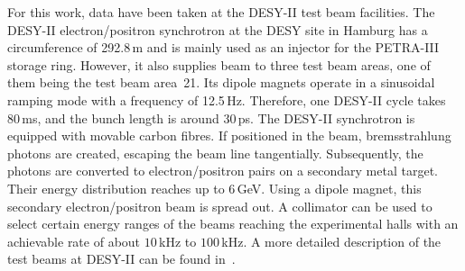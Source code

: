 
For this work, data have been taken at the {DESY-II} test beam facilities. 
The DESY-II electron/positron synchrotron at the DESY site in Hamburg has a circumference of 292.8\,m and is mainly used as an injector for the PETRA-III storage ring. 
However, it also supplies beam to three test beam areas, one  of them being the test beam area~21.
Its dipole magnets operate in a sinusoidal ramping mode with a frequency of 12.5\,Hz. 
Therefore, one DESY-II cycle takes 80\,ms, and the bunch length is around 30\,ps. 
The DESY-II synchrotron is equipped with movable carbon fibres. 
If positioned in the beam, bremsstrahlung photons are created, escaping the beam line tangentially.
Subsequently, the photons are converted to electron/positron pairs on a secondary metal target. 
Their energy distribution reaches up to 6\,GeV. 
Using a dipole magnet, this secondary electron/positron beam is spread out.
A collimator can be used to select certain energy ranges of the beams reaching the experimental halls with an achievable rate of about $10$\,kHz to $100$\,kHz. 
A more detailed description of the test beams at {DESY-II} can be found in~\cite{EUDET-2007-11}.



